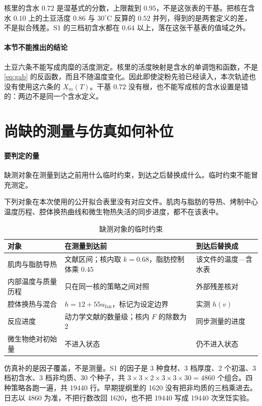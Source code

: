核里的含水 \(0.72\) 是湿基式的分数，上限裁到 \(0.95\)，不是这张表的干基。把核在含水 \(0.10\) 上的土豆活度 \(0.86\) 与 \(30^\circ\mathrm{C}\) 反算的 \(0.52\) 并列，得到的是两套定义的差，不是拟合残差。S1 的三档初含水都在 \(0.64\) 以上，落在这张干基表的值域之外。

\paragraph{本节不能推出的结论}
土豆六条不能写成肉糜的活度测定。核里的活度映射是含水的单调饱和函数，不是 \eqref{eq:gab} 的反函数，而且不随温度变化。因此即使淀粉先验已经读入，本次轨迹也没有使用这六条的 \(X_m(T)\)。干基 \(0.72\) 没有根，也不能写成核的含水设置是错的：两边不是同一个含水定义。

\section{尚缺的测量与仿真如何补位}

\paragraph{要判定的量}
缺测对象在测量到达之前用什么临时约束，到达之后替换成什么。临时约束不能冒充测定。

下列对象在本次使用的公开拟合表里没有对应文件。肌肉与脂肪的导热、烤制中心温度历程、腔体换热曲线和微生物热失活的同步进度，都不在该表中。

\begin{table}[ht]
\centering
\caption{缺测对象的临时约束}
\begin{tabularx}{\textwidth}{lXl}
\toprule
对象 & 在测量到达前 & 到达后替换成 \\
\midrule
肌肉与脂肪导热 & 文献区间；核内取 \(k=0.68\)，脂肪控制体乘 \(0.45\) & 该文件的温度—含水表 \\
内部温度与质量历程 & 只在同一核的策略之间对照 & 外部残差核对 \\
腔体换热与混合 & \(h=12+55u_{\mathrm{fan}}\)，标记为设定边界 & 实测 \(h(v)\) \\
反应进度 & 动力学文献的数量级；核内 \(F\) 的除数为 2 & 同步测量的进度 \\
微生物绝对初始量 & 不进入状态 & 仍不进入状态 \\
\bottomrule
\end{tabularx}
\end{table}

仿真补的是因子覆盖，不是测量。S1 的因子是 3 种食材、3 档厚度、2 个初温、3 档初含水、3 档非均质、30 个种子，共 \(3\times 3\times 2\times 3\times 3\times 30=4860\) 个组合。四种策略各跑一遍，共 19440 行。早期提纲里的 1620 没有把非均质的三档乘进去。日志以 4860 为准，不把行数改回 1620，也不把 19440 写成 19440 次烹饪实验。

